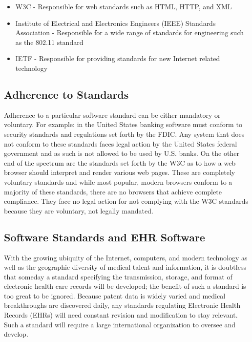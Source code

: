 \documentclass[14pt]{article}
\begin{document}
\begin{itemize}
\item \gls{W3C} - Responsible for web standards such as \gls{HTML}, HTTP, and XML 
\item Institute of Electrical and Electronics Engineers (IEEE) Standards Association - Responsible for a wide range of standards for engineering such as the 802.11 standard
\item \gls{IETF} - Responsible for providing standards for new Internet related technology 
\end{itemize}


\subsection{Adherence to Standards}
Adherence to a particular software standard can be either mandatory or voluntary. For example: in the United States banking software must conform to security standards and regulations set forth by the \gls{FDIC}. Any system that does not conform to these standards faces legal action by the United States federal government and as such is not allowed to be used by U.S. banks. On the other end of the spectrum are the standards set forth by the W3C as to how a web browser should interpret and render various web pages. These are completely voluntary standards and while most popular, modern browsers conform to a majority of these standards, there are no browsers that achieve complete compliance. They face no legal action for not complying with the W3C standards because they are voluntary, not legally mandated.

\subsection{Software Standards and EHR Software}
With the growing ubiquity of the Internet, computers, and modern technology as well as the geographic diversity of medical talent and information, it is doubtless that someday a standard specifying the transmission, storage, and format of electronic health care records will be developed; the benefit of such a standard is too great to be ignored. Because patent data is widely varied and medical breakthroughs are discovered daily, any standards regulating Electronic Health Records (EHRs) will need constant revision and modification to stay relevant. Such a standard will require a large international organization to oversee and develop.
\end{document}
